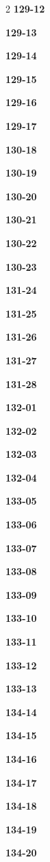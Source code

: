 \documentclass[10pt,a4paper]{article}
\begin{document}
\begin{multicols}{2}
\noindent\textbf{129-12}\ \par
\noindent\textbf{129-13}\ \par
\noindent\textbf{129-14}\ \par
\noindent\textbf{129-15}\ \par
\noindent\textbf{129-16}\ \par
\noindent\textbf{129-17}\ \par
\noindent\textbf{130-18}\ \par
\noindent\textbf{130-19}\ \par
\noindent\textbf{130-20}\ \par
\noindent\textbf{130-21}\ \par
\noindent\textbf{130-22}\ \par
\noindent\textbf{130-23}\ \par
\noindent\textbf{131-24}\ \par
\noindent\textbf{131-25}\ \par
\noindent\textbf{131-26}\ \par
\noindent\textbf{131-27}\ \par
\noindent\textbf{131-28}\ \par
\noindent\textbf{132-01}\ \par
\noindent\textbf{132-02}\ \par
\noindent\textbf{132-03}\ \par
\noindent\textbf{132-04}\ \par
\noindent\textbf{133-05}\ \par
\noindent\textbf{133-06}\ \par
\noindent\textbf{133-07}\ \par
\noindent\textbf{133-08}\ \par
\noindent\textbf{133-09}\ \par
\noindent\textbf{133-10}\ \par
\noindent\textbf{133-11}\ \par
\noindent\textbf{133-12}\ \par
\noindent\textbf{133-13}\ \par
\noindent\textbf{134-14}\ \par
\noindent\textbf{134-15}\ \par
\noindent\textbf{134-16}\ \par
\noindent\textbf{134-17}\ \par
\noindent\textbf{134-18}\ \par
\noindent\textbf{134-19}\ \par
\noindent\textbf{134-20}\ \par

\end{multicols}
\end{document}
